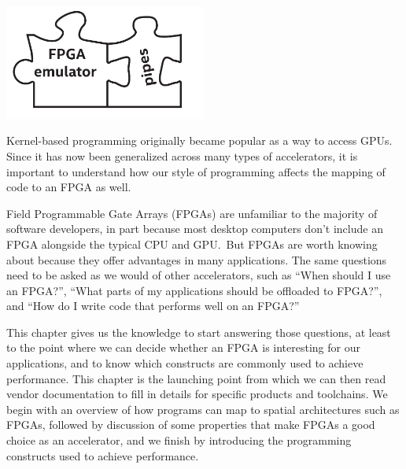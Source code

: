 \begin{center}
	\includegraphics[width=0.5\textwidth]{content/chapter-17/images/1}
\end{center}

Kernel-based programming originally became popular as a way to access GPUs. Since it has now been generalized across many types of accelerators, it is important to understand how our style of programming affects the mapping of code to an FPGA as well.\par

Field Programmable Gate Arrays (FPGAs) are unfamiliar to the majority of software developers, in part because most desktop computers don’t include an FPGA alongside the typical CPU and GPU. But FPGAs are worth knowing about because they offer advantages in many applications. The same questions need to be asked as we would of other accelerators, such as “When should I use an FPGA?”, “What parts of my applications should be offloaded to FPGA?”, and “How do I write code that performs well on an FPGA?”\par

This chapter gives us the knowledge to start answering those questions, at least to the point where we can decide whether an FPGA is interesting for our applications, and to know which constructs are commonly used to achieve performance. This chapter is the launching point from which we can then read vendor documentation to fill in details for specific products and toolchains. We begin with an overview of how programs can map to spatial architectures such as FPGAs, followed by discussion of some properties that make FPGAs a good choice as an accelerator, and we finish by introducing the programming constructs used to achieve performance.

